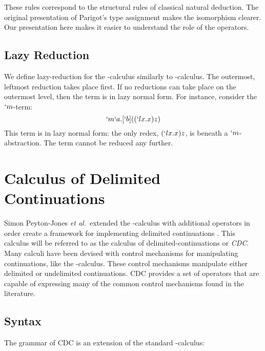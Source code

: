   
  These rules correspond to the structural rules of classical natural deduction.
  The original presentation of Parigot's type assignment makes the isomorphism clearer.
  Our presentation here makes it easier to understand the role of the operators.
  
  \subsection{Lazy Reduction}
  We define lazy-reduction for the \lmu-calculus similarly to \lam-calculus.
  The outermost, leftmost reduction takes place first. 
  If no reductions can take place on the outermost level, then the term is in lazy normal form.
  For instance, consider the $`m$-term:
  \[
    `m`a.[`b]((`lx.x)z)
  \]
  This term is in lazy normal form: the only redex, $(`lx.x)z$, is beneath a $`m$-abstraction.
  The term cannot be reduced any further.

\section{Calculus of Delimited Continuations}

  Simon Peyton-Jones \textit{et al.}\ extended the \lam-calculus with additional operators in order create a framework for implementing delimited continuations \cite{JonesDS07}. 
  This calculus will be referred to as the calculus of delimited-continuations or \emph{CDC}. 
  Many calculi have been devised with control mechanisms for manipulating continuations, like the \lmu-calculus.
  These control mechanisms manipulate either delimited or undelimited continuations. 
  CDC provides a set of operators that are capable of expressing many of the common control mechanisms found in the literature.

  \subsection{Syntax}
  The grammar of CDC is an extension of the standard \lam-calculus:

